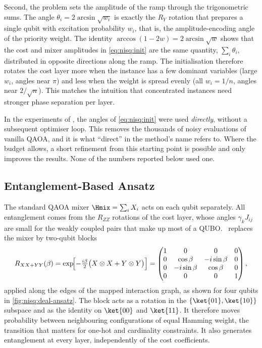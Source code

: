 Second, the problem sets the amplitude of the ramp through the trigonometric sums. The angle $\theta_{i}=2\arcsin\sqrt{w_{i}}$ is exactly the $R_{Y}$ rotation that prepares a single qubit with excitation probability $w_{i}$, that is, the amplitude-encoding angle of the priority weight. The identity $\arccos(1-2w)=2\arcsin\sqrt{w}$ shows that the cost and mixer amplitudes in \cref{eq:nisq:init} are the same quantity, $\sum_{i}\theta_{i}$, distributed in opposite directions along the ramp. The initialisation therefore rotates the cost layer more when the instance has a few dominant variables (large $w_{i}$, angles near $\pi$) and less when the weight is spread evenly (all $w_{i}=1/n$, angles near $2/\sqrt{n}$). This matches the intuition that concentrated instances need stronger phase separation per layer.

In the experiments of \cite{guo2025deal}, the angles of \cref{eq:nisq:init} were used \emph{directly}, without a subsequent optimiser loop. This removes the thousands of noisy evaluations of vanilla QAOA, and it is what ``direct'' in the method's name refers to. Where the budget allows, a short refinement from this starting point is possible and only improves the results. None of the numbers reported below used one.

\subsection{Entanglement-Based Ansatz}\label{sec:nisq:ansatz}

The standard QAOA mixer $\Hmix=\sum_{i}X_{i}$ acts on each qubit separately. All entanglement comes from the $R_{ZZ}$ rotations of the cost layer, whose angles $\gamma_{k}J_{ij}$ are small for the weakly coupled pairs that make up most of a QUBO. \deal\ replaces the mixer by two-qubit blocks
\begin{equation}\label{eq:nisq:mixer}
  R_{XX+YY}(\beta) = \exp\!\Bigl[-\tfrac{i\beta}{2}\bigl(X\otimes X + Y\otimes Y\bigr)\Bigr]
  = \begin{pmatrix} 1 & 0 & 0 & 0\\ 0 & \cos\beta & -i\sin\beta & 0\\ 0 & -i\sin\beta & \cos\beta & 0\\ 0&0&0&1\end{pmatrix},
\end{equation}
applied along the edges of the mapped interaction graph, as shown for four qubits in \cref{fig:nisq:deal-ansatz}. The block acts as a rotation in the $\{\ket{01},\ket{10}\}$ subspace and as the identity on $\ket{00}$ and $\ket{11}$. It therefore moves probability between neighbouring configurations of equal Hamming weight, the transition that matters for one-hot and cardinality constraints. It also generates entanglement at every layer, independently of the cost coefficients.

